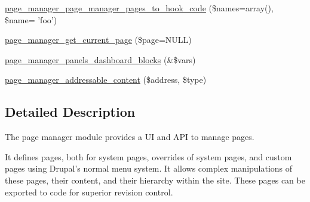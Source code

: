 \begin{DoxyCompactItemize}
\item 
\hyperlink{page__manager_8module_ace4a8a2f8c7273573e7329b844fdc58c}{page\_\-manager\_\-page\_\-manager\_\-pages\_\-to\_\-hook\_\-code} (\$names=array(), \$name= 'foo')
\item 
\hyperlink{page__manager_8module_a2f7eaa17ced7d0447b77cf272e7f42a3}{page\_\-manager\_\-get\_\-current\_\-page} (\$page=NULL)
\item 
\hyperlink{page__manager_8module_a736c333fee060edd8676d879c15d22a9}{page\_\-manager\_\-panels\_\-dashboard\_\-blocks} (\&\$vars)
\item 
\hyperlink{page__manager_8module_a0ca842046b6ffb242872041ef3db981b}{page\_\-manager\_\-addressable\_\-content} (\$address, \$type)
\end{DoxyCompactItemize}


\subsection{Detailed Description}
The page manager module provides a UI and API to manage pages.

It defines pages, both for system pages, overrides of system pages, and custom pages using Drupal's normal menu system. It allows complex manipulations of these pages, their content, and their hierarchy within the site. These pages can be exported to code for superior revision control. 

